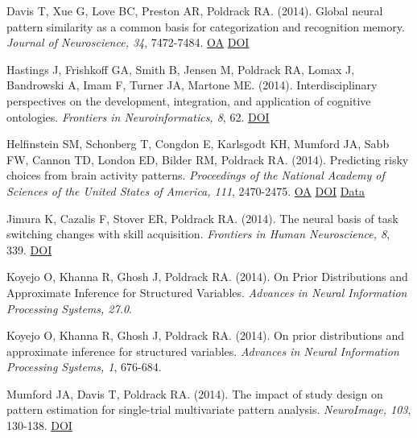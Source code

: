 \documentclass[10pt, letterpaper]{article}
\begin{document}
Davis T, Xue G, Love BC, Preston AR, Poldrack RA.  (2014). Global neural pattern similarity as a common basis for categorization and recognition memory. \textit{Journal of Neuroscience, 34}, 7472-7484. \href{https://www.ncbi.nlm.nih.gov/pmc/articles/PMC4035513}{OA} \href{https://doi.org/10.1523/jneurosci.3376-13.2014}{DOI} \vspace{2mm}

Hastings J, Frishkoff GA, Smith B, Jensen M, Poldrack RA, Lomax J, Bandrowski A, Imam F, Turner JA, Martone ME.  (2014). Interdisciplinary perspectives on the development, integration, and application of cognitive ontologies. \textit{Frontiers in Neuroinformatics, 8}, 62. \href{https://doi.org/10.3389/fninf.2014.00062}{DOI} \vspace{2mm}

Helfinstein SM, Schonberg T, Congdon E, Karlsgodt KH, Mumford JA, Sabb FW, Cannon TD, London ED, Bilder RM, Poldrack RA.  (2014). Predicting risky choices from brain activity patterns. \textit{Proceedings of the National Academy of Sciences of the United States of America, 111}, 2470-2475. \href{https://www.ncbi.nlm.nih.gov/pmc/articles/PMC3932884}{OA} \href{https://doi.org/10.1073/pnas.1321728111}{DOI} \href{https://openneuro.org/datasets/ds000030/versions/1.0.0}{Data} \vspace{2mm}

Jimura K, Cazalis F, Stover ER, Poldrack RA.  (2014). The neural basis of task switching changes with skill acquisition. \textit{Frontiers in Human Neuroscience, 8}, 339. \href{https://doi.org/10.3389/fnhum.2014.00339}{DOI} \vspace{2mm}

Koyejo O, Khanna R, Ghosh J, Poldrack RA.  (2014). On Prior Distributions and Approximate Inference for Structured Variables. \textit{Advances in Neural Information Processing Systems, 27.0}. \vspace{2mm}

Koyejo O, Khanna R, Ghosh J, Poldrack RA.  (2014). On prior distributions and approximate inference for structured variables. \textit{Advances in Neural Information Processing Systems, 1}, 676-684. \vspace{2mm}

Mumford JA, Davis T, Poldrack RA.  (2014). The impact of study design on pattern estimation for single-trial multivariate pattern analysis. \textit{NeuroImage, 103}, 130-138. \href{https://doi.org/10.1016/j.neuroimage.2014.09.026}{DOI} \vspace{2mm}
\end{document}

